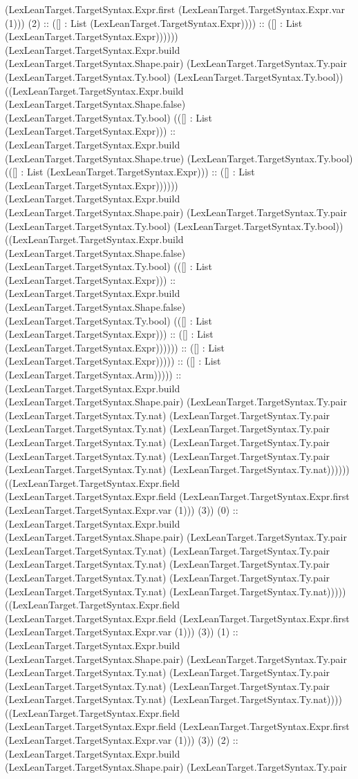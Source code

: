 \documentclass[11pt]{article}
\begin{document}
(LexLeanTarget.TargetSyntax.Expr.first (LexLeanTarget.TargetSyntax.Expr.var (1))) (2) :: ([] : List (LexLeanTarget.TargetSyntax.Expr)))) :: ([] : List (LexLeanTarget.TargetSyntax.Expr)))))) (LexLeanTarget.TargetSyntax.Expr.build (LexLeanTarget.TargetSyntax.Shape.pair) (LexLeanTarget.TargetSyntax.Ty.pair (LexLeanTarget.TargetSyntax.Ty.bool) (LexLeanTarget.TargetSyntax.Ty.bool)) ((LexLeanTarget.TargetSyntax.Expr.build (LexLeanTarget.TargetSyntax.Shape.false) (LexLeanTarget.TargetSyntax.Ty.bool) (([] : List (LexLeanTarget.TargetSyntax.Expr))) :: (LexLeanTarget.TargetSyntax.Expr.build (LexLeanTarget.TargetSyntax.Shape.true) (LexLeanTarget.TargetSyntax.Ty.bool) (([] : List (LexLeanTarget.TargetSyntax.Expr))) :: ([] : List (LexLeanTarget.TargetSyntax.Expr)))))) (LexLeanTarget.TargetSyntax.Expr.build (LexLeanTarget.TargetSyntax.Shape.pair) (LexLeanTarget.TargetSyntax.Ty.pair (LexLeanTarget.TargetSyntax.Ty.bool) (LexLeanTarget.TargetSyntax.Ty.bool)) ((LexLeanTarget.TargetSyntax.Expr.build (LexLeanTarget.TargetSyntax.Shape.false) (LexLeanTarget.TargetSyntax.Ty.bool) (([] : List (LexLeanTarget.TargetSyntax.Expr))) :: (LexLeanTarget.TargetSyntax.Expr.build (LexLeanTarget.TargetSyntax.Shape.false) (LexLeanTarget.TargetSyntax.Ty.bool) (([] : List (LexLeanTarget.TargetSyntax.Expr))) :: ([] : List (LexLeanTarget.TargetSyntax.Expr)))))) :: ([] : List (LexLeanTarget.TargetSyntax.Expr))))) :: ([] : List (LexLeanTarget.TargetSyntax.Arm))))) :: (LexLeanTarget.TargetSyntax.Expr.build (LexLeanTarget.TargetSyntax.Shape.pair) (LexLeanTarget.TargetSyntax.Ty.pair (LexLeanTarget.TargetSyntax.Ty.nat) (LexLeanTarget.TargetSyntax.Ty.pair (LexLeanTarget.TargetSyntax.Ty.nat) (LexLeanTarget.TargetSyntax.Ty.pair (LexLeanTarget.TargetSyntax.Ty.nat) (LexLeanTarget.TargetSyntax.Ty.pair (LexLeanTarget.TargetSyntax.Ty.nat) (LexLeanTarget.TargetSyntax.Ty.pair (LexLeanTarget.TargetSyntax.Ty.nat) (LexLeanTarget.TargetSyntax.Ty.nat)))))) ((LexLeanTarget.TargetSyntax.Expr.field (LexLeanTarget.TargetSyntax.Expr.field (LexLeanTarget.TargetSyntax.Expr.first (LexLeanTarget.TargetSyntax.Expr.var (1))) (3)) (0) :: (LexLeanTarget.TargetSyntax.Expr.build (LexLeanTarget.TargetSyntax.Shape.pair) (LexLeanTarget.TargetSyntax.Ty.pair (LexLeanTarget.TargetSyntax.Ty.nat) (LexLeanTarget.TargetSyntax.Ty.pair (LexLeanTarget.TargetSyntax.Ty.nat) (LexLeanTarget.TargetSyntax.Ty.pair (LexLeanTarget.TargetSyntax.Ty.nat) (LexLeanTarget.TargetSyntax.Ty.pair (LexLeanTarget.TargetSyntax.Ty.nat) (LexLeanTarget.TargetSyntax.Ty.nat))))) ((LexLeanTarget.TargetSyntax.Expr.field (LexLeanTarget.TargetSyntax.Expr.field (LexLeanTarget.TargetSyntax.Expr.first (LexLeanTarget.TargetSyntax.Expr.var (1))) (3)) (1) :: (LexLeanTarget.TargetSyntax.Expr.build (LexLeanTarget.TargetSyntax.Shape.pair) (LexLeanTarget.TargetSyntax.Ty.pair (LexLeanTarget.TargetSyntax.Ty.nat) (LexLeanTarget.TargetSyntax.Ty.pair (LexLeanTarget.TargetSyntax.Ty.nat) (LexLeanTarget.TargetSyntax.Ty.pair (LexLeanTarget.TargetSyntax.Ty.nat) (LexLeanTarget.TargetSyntax.Ty.nat)))) ((LexLeanTarget.TargetSyntax.Expr.field (LexLeanTarget.TargetSyntax.Expr.field (LexLeanTarget.TargetSyntax.Expr.first (LexLeanTarget.TargetSyntax.Expr.var (1))) (3)) (2) :: (LexLeanTarget.TargetSyntax.Expr.build (LexLeanTarget.TargetSyntax.Shape.pair) (LexLeanTarget.TargetSyntax.Ty.pair 
\end{document}
